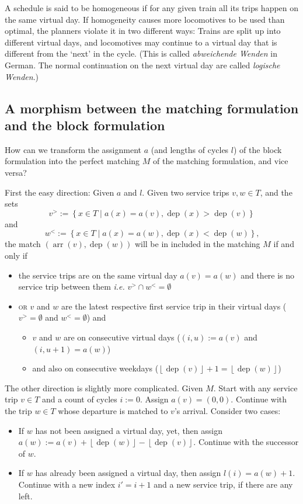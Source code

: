 \documentclass[a4paper]{amsart}
\theoremstyle{definition}
\theoremstyle{remark}
\def\ie{\emph{i.e.}}
\newcommand{\lr}[1]{\ensuremath{\left( #1 \right)}}
\newcommand{\lrM}[1]{\ensuremath{\left\{ #1 \right\}}}
\newcommand\dep[0]{\ensuremath{\operatorname{dep}}}
\newcommand\arr[0]{\ensuremath{\operatorname{arr}}}
\begin{document}
A schedule is said to be homogeneous if for any given train all its
trips happen on the same virtual day.  If homogeneity causes more
locomotives to be used than optimal, the planners violate it in two
different ways: Trains are split up into different virtual days, and
locomotives may continue to a virtual day that is different from the
`next' in the cycle.  (This is called \textit{abweichende Wenden} in
German.  The normal continuation on the next virtual day are called
\textit{logische Wenden}.)

\subsection{A morphism between the matching formulation and the block formulation}

How can we transform the assignment \(a\) (and lengths of cycles
\(l\)) of the block formulation into the perfect matching \(M\) of the
matching formulation, and vice versa?

First the easy direction: Given \(a\) and \(l\).  Given two service
trips \(v, w \in T\), and the sets \[v^> := \lrM{x \in T \mid a\lr{x}
  = a\lr{v}, \dep\lr{x} > \dep\lr{v}}\] and
 \[w^< := \lrM{x \in T \mid
  a\lr{x} = a\lr{w}, \dep\lr{x} < \dep\lr{w}}\text{,}\] the match
\(\lr{\arr\lr{v}, \dep\lr{w}}\) will be in included in the matching
\(M\) if and only if
\begin{itemize}
\item the service trips are on the same virtual day \(a \lr{v} = a \lr{w}\) and there is no service trip between them \ie{}
  \(v^> \cap w^< = \emptyset\)
\item \textsc{or} \(v\) and \(w\) are the latest respective first service trip in their virtual days (\(v^> = \emptyset\) and \(w^< = \emptyset\))
  and
  \begin{itemize}
  \item \(v\) and \(w\) are on consecutive virtual days (\(\lr{i, u} := a\lr{v}\) and \(\lr{i, u+1} = a\lr{w}\))
  \item and also on consecutive weekdays (\(\left\lfloor \dep\lr{v}\right\rfloor + 1 = \left\lfloor \dep\lr{w}\right\rfloor \))
  \end{itemize}
\end{itemize}

The other direction is slightly more complicated.  Given \(M\).  Start
with any service trip \(v \in T\) and a count of cycles \(i := 0\).  Assign \(a\lr{v} = \lr{0,0}\).
Continue with the trip \(w \in T\) whose departure is matched to
\(v\)'s arrival.  Consider two cases:
\begin{itemize}
  \item If \(w\) has not been assigned a virtual day, yet, then assign \(a\lr{w} := a\lr{v} + \left\lfloor \dep\lr{w}\right\rfloor - \left\lfloor \dep\lr{v}\right\rfloor \).  Continue with the successor of \(w\).
  \item If \(w\) has already been assigned a virtual day, then assign
    \(l\lr{i} = a\lr{w} + 1\).  Continue with a new index \(i' = i+1\)
    and a new service trip, if there are any left.
\end{itemize}
\end{document}
